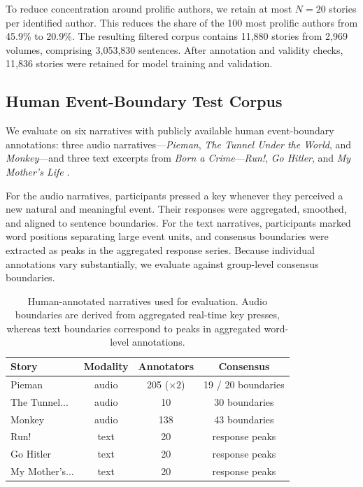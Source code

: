 \documentclass[11pt]{article}
\begin{document}
To reduce concentration around prolific authors, we retain at most $N=20$ stories per identified author. This reduces the share of the 100 most prolific authors from 45.9\% to 20.9\%. The resulting filtered corpus contains 11,880 stories from 2,969 volumes,
comprising 3,053,830 sentences. After annotation and validity checks, 11,836 stories were retained for model training and validation.

\subsection{Human Event-Boundary Test Corpus}
\label{app:Test-Corpus}

We evaluate on six narratives with publicly available human event-boundary annotations: three audio narratives---\textit{Pieman}, \textit{The Tunnel Under the World}, and \textit{Monkey}---and three text excerpts from \textit{Born a Crime}---\textit{Run!}, \textit{Go Hitler}, and \textit{My Mother's Life} \citep{michelmann2025large,panela2025event}.

For the audio narratives, participants pressed a key whenever they perceived a new natural and meaningful event. Their responses were aggregated, smoothed, and aligned to sentence boundaries. For the text narratives, participants marked word positions separating large event units, and consensus boundaries were extracted as peaks in the aggregated response series. Because individual annotations vary substantially, we evaluate against group-level consensus boundaries.

\begin{table}[h]
\centering
\scriptsize
\begin{tabular}{@{}lccc@{}}
\toprule
\textbf{Story} & \textbf{Modality} & \textbf{Annotators} & \textbf{Consensus} \\
\midrule
Pieman & audio & 205 ($\times2$) & 19 / 20 boundaries \\
The Tunnel... & audio & 10 & 30 boundaries \\
Monkey & audio & 138 & 43 boundaries \\
Run! & text & 20 & response peaks \\
Go Hitler & text & 20 & response peaks \\
My Mother's... & text & 20 & response peaks \\
\bottomrule
\end{tabular}
\caption{Human-annotated narratives used for evaluation. Audio boundaries are derived from aggregated real-time key presses, whereas text boundaries correspond to peaks in aggregated word-level annotations.}
\label{tab:test-data}
\end{table}
\end{document}
